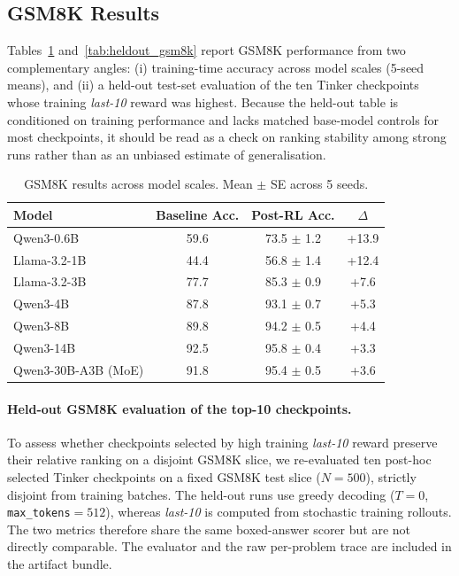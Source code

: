 \documentclass{article}
\begin{document}
\subsection{GSM8K Results}
\label{sec:gsm8k_results}

Tables~\ref{tab:results_gsm8k} and~\ref{tab:heldout_gsm8k} report GSM8K
performance from two complementary angles: (i) training-time accuracy across
model scales (5-seed means), and (ii) a held-out test-set evaluation of the
ten Tinker checkpoints whose training \emph{last-10} reward was highest.
Because the held-out table is conditioned on training performance and lacks
matched base-model controls for most checkpoints, it should be read as a
check on ranking stability among strong runs rather than as an unbiased
estimate of generalisation.

\begin{table}[htbp]
\centering
\caption{GSM8K results across model scales. Mean $\pm$ SE across 5 seeds.}
\label{tab:results_gsm8k}
\begin{tabular}{lccc}
\toprule
\textbf{Model} & \textbf{Baseline Acc.} & \textbf{Post-RL Acc.} & \textbf{$\Delta$} \\
\midrule
Qwen3-0.6B & 59.6 & 73.5 $\pm$ 1.2 & +13.9 \\
Llama-3.2-1B & 44.4 & 56.8 $\pm$ 1.4 & +12.4 \\
Llama-3.2-3B & 77.7 & 85.3 $\pm$ 0.9 & +7.6 \\
Qwen3-4B & 87.8 & 93.1 $\pm$ 0.7 & +5.3 \\
Qwen3-8B & 89.8 & 94.2 $\pm$ 0.5 & +4.4 \\
Qwen3-14B & 92.5 & 95.8 $\pm$ 0.4 & +3.3 \\
Qwen3-30B-A3B (MoE) & 91.8 & 95.4 $\pm$ 0.5 & +3.6 \\
\bottomrule
\end{tabular}
\end{table}

\paragraph{Held-out GSM8K evaluation of the top-10 checkpoints.}
To assess whether checkpoints selected by high training \emph{last-10} reward
preserve their relative ranking on a disjoint GSM8K slice, we re-evaluated
ten post-hoc selected Tinker checkpoints on a fixed GSM8K test slice
($N=500$), strictly disjoint from training batches. The held-out runs use
greedy decoding ($T{=}0$, \texttt{max\_tokens}$=512$), whereas
\emph{last-10} is computed from stochastic training rollouts. The two
metrics therefore share the same boxed-answer scorer but are not directly
comparable.
The evaluator and the raw per-problem trace are included in the artifact
bundle.
\end{document}

